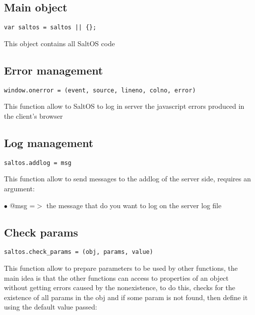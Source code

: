 \documentclass[a4paper]{book}
\begin{document}
\hypertarget{toc418}{}
\subsection{Main object}

\begin{lstlisting}
var saltos = saltos || {};
\end{lstlisting}

This object contains all SaltOS code

\hypertarget{toc419}{}
\subsection{Error management}

\begin{lstlisting}
window.onerror = (event, source, lineno, colno, error)
\end{lstlisting}

This function allow to SaltOS to log in server the javascript errors produced in the client's browser

\hypertarget{toc420}{}
\subsection{Log management}

\begin{lstlisting}
saltos.addlog = msg
\end{lstlisting}

This function allow to send messages to the addlog of the server side, requires an argument:

\begin{compactitem}
\item[\color{myblue}$\bullet$] @msg =$>$ the message that do you want to log on the server log file
\end{compactitem}

\hypertarget{toc421}{}
\subsection{Check params}

\begin{lstlisting}
saltos.check_params = (obj, params, value)
\end{lstlisting}

This function allow to prepare parameters to be used by other functions, the main idea
is that the other functions can access to properties of an object without getting errors
caused by the nonexistence, to do this, checks for the existence of all params in the obj
and if some param is not found, then define it using the default value passed:
\end{document}
